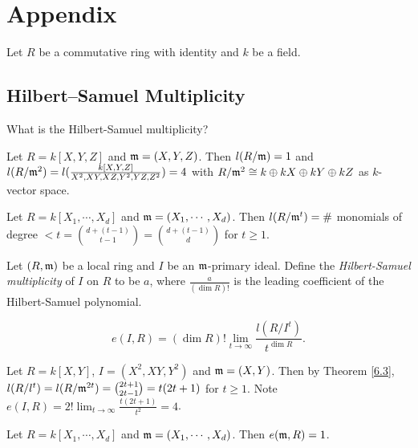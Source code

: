 \chapter{Appendix}

Let $R$ be a commutative ring with identity and $k$ be a field. 

\section*{Hilbert–Samuel Multiplicity}

\begin{question}\label{6.1}
    What is the Hilbert-Samuel multiplicity? 
\end{question}

\begin{example}\label{6.2}
    Let $R = k[X,Y,Z]$ and $\mathfrak{m} = (X,Y,Z)$. Then $l(R/\mathfrak{m}) = 1$ and $l(R/\mathfrak{m}^{2}) = l(\frac{k[X,Y,Z]}{X^{2},XY,XZ,Y^{2},YZ,Z^{2}}) = 4$ with $R/\mathfrak{m}^{2} \cong k \oplus kX \oplus kY \oplus kZ$ as $k$-vector space.
\end{example}

\begin{theorem}\label{6.3}
    Let $R = k[X_1,\cdots,X_d]$ and $\mathfrak{m} = (X_1,\cdots,X_d)$. Then $l(R/\mathfrak{m}^{t}) = \#$ monomials of degree  $< t = \binom {d + (t-1)}{t-1} = \binom {d+(t-1)}{d}$ for $t \geq 1$.
\end{theorem}

\begin{definition}\label{6.4}
    Let $(R,\mathfrak{m})$ be a local ring and $I$ be an $\mathfrak{m}$-primary ideal. Define the \emph{Hilbert-Samuel multiplicity} of $I$ on $R$ to be $a$, where $\frac{a}{(\dim R)!}$ is the leading coefficient of the Hilbert-Samuel polynomial.
\end{definition}

\begin{definition}\label{6.5}
    \[e(I,R) = (\dim R)! \lim_{t \to \infty} \frac{l(R/I^{t})}{t^{\dim R}}.\]
\end{definition}

\begin{example}\label{6.6}
    Let $R = k[X,Y]$, $I = (X^{2},XY,Y^{2})$ and $\mathfrak{m} = (X,Y)$. Then by Theorem \ref{6.3}, $l(R/l^{t}) = l(R/\mathfrak{m}^{2t}) = \binom {2t+1}{2t-1} = t(2t+1)$ for $t \geq 1$. Note $e(I,R) = 2! \lim_{t \to \infty} \frac{t(2t+1)}{t^{2}} = 4$.
\end{example}

\begin{fact}\label{6.7}
    Let $R = k[X_1,\cdots,X_d]$ and $\mathfrak{m} = (X_1,\cdots,X_d)$. Then $e(\mathfrak{m},R) = 1$.
\end{fact}

